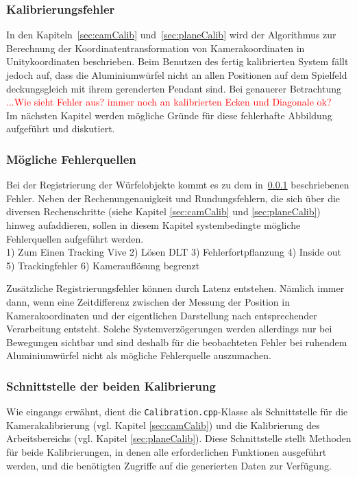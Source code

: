 \subsubsection{Kalibrierungsfehler} \label{sec:calibError}
In den Kapiteln~\ref{sec:camCalib} und~\ref{sec:planeCalib} wird der Algorithmus zur Berechnung der Koordinatentransformation von Kamerakoordinaten in Unitykoordinaten beschrieben. Beim Benutzen des fertig kalibrierten System fällt jedoch auf, dass die Aluminiumwürfel nicht an allen Positionen auf dem Spielfeld deckungsgleich mit ihrem gerenderten Pendant sind.  Bei genauerer Betrachtung \textcolor{red}{...Wie sieht Fehler aus? immer noch an kalibrierten Ecken und Diagonale ok?}\\
Im nächsten Kapitel werden mögliche Gründe für diese fehlerhafte Abbildung aufgeführt und diskutiert. 


\subsubsection{Mögliche Fehlerquellen} \label{sec:calibErrorSources}
Bei der Registrierung der Würfelobjekte kommt es zu dem in~\ref{sec:calibError} beschriebenen Fehler.
Neben der Rechenungenauigkeit und Rundungsfehlern, die sich über die diversen Rechenschritte (siehe Kapitel \ref{sec:camCalib} und \ref{sec:planeCalib}) hinweg aufaddieren, sollen in diesem Kapitel systembedingte mögliche Fehlerquellen aufgeführt werden. \\


1) Zum Einen Tracking Vive
2) Lösen DLT
3) Fehlerfortpflanzung
4) Inside out
5) Trackingfehler
6) Kamerauflösung begrenzt

Zusätzliche Registrierungsfehler können durch Latenz entstehen. Nämlich immer dann, wenn eine Zeitdifferenz zwischen der Messung der Position in Kamerakoordinaten und der eigentlichen Darstellung nach entsprechender
Verarbeitung entsteht. Solche Systemverzögerungen werden allerdings nur bei Bewegungen sichtbar und sind deshalb für die beobachteten Fehler bei ruhendem Aluminiumwürfel nicht als mögliche Fehlerquelle auszumachen. 
\subsubsection{Schnittstelle der beiden Kalibrierung} \label{sec:CalibSteuerung}
Wie eingangs erwähnt, dient die \texttt{Calibration.cpp}-Klasse als Schnittstelle für die Kamerakalibrierung (vgl. Kapitel \ref{sec:camCalib}) und die Kalibrierung des Arbeitsbereichs (vgl. Kapitel \ref{sec:planeCalib}). Diese Schnittstelle stellt Methoden für beide Kalibrierungen, in denen alle erforderlichen Funktionen ausgeführt werden, und die benötigten Zugriffe auf die generierten Daten zur Verfügung.

